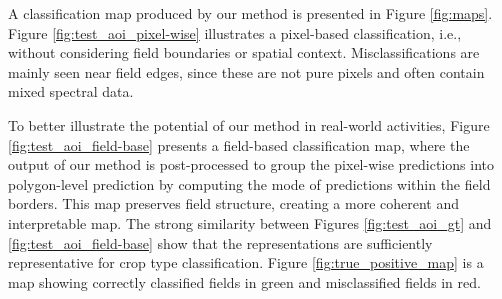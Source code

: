 \documentclass[journal,article,submit,pdftex,moreauthors]{Definitions/mdpi}
\begin{document}


A classification map produced by our method is presented in Figure \ref{fig:maps}. 
Figure \ref{fig:test_aoi_pixel-wise} illustrates a pixel-based classification, i.e., without considering field boundaries or spatial context. Misclassifications are mainly seen  near field edges, since these are not pure pixels and often contain mixed spectral data. 

To better illustrate the potential of our method in real-world activities, Figure \ref{fig:test_aoi_field-base} presents a field-based classification map, where the output of our method is post-processed to group the pixel-wise predictions into polygon-level prediction by computing the mode of predictions within the field borders. This map preserves field structure, creating a more coherent and interpretable map. The strong similarity between Figures \ref{fig:test_aoi_gt} and \ref{fig:test_aoi_field-base} show that the representations are sufficiently representative for crop type classification. 
Figure \ref{fig:true_positive_map} is a map showing correctly classified fields in green and misclassified fields in red.
\end{document}
